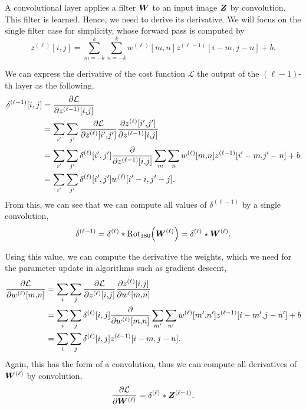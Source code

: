 A convolutional layer applies a filter $\bm{W}$ to an input image $\bm{Z}$ by convolution. This
filter is learned. Hence, we need to derive its derivative. We will focus on the single filter case
for simplicity, whose forward pass is computed by \[
    z^{(\ell)}[i,j] = \sum_{m=-k}^{k} \sum_{n=-k}^{k} w^{(\ell)}[m,n] z^{(\ell-1)}[i-m,j-n] + b.
\]

We can express the derivative of the cost function $\mathcal{L}$ \wrt the output of the
$(\ell-1)$-th layer as the following,
\begin{align*}
    \delta^{(\ell-1)}[i,j] & = \pdv{\mathcal{L}}{z^{(\ell-1)}[i{,}j]}                                                                                                   \\
                           & = \sum_{i'} \sum_{j'} \pdv{\mathcal{L}}{z^{(\ell)}[i'{,}j']} \pdv{z^{(\ell)}[i'{,}j']}{z^{(\ell-1)}[i{,}j]}                                \\
                           & = \sum_{i'} \sum_{j'} \delta^{(\ell)}[i',j'] \pdv*{\sum_{m} \sum_{n} w^{(\ell)}[m{,}n] z^{(\ell-1)}[i'-m{,}j'-n] + b}{z^{(\ell-1)}[i{,}j]} \\
                           & = \sum_{i'} \sum_{j'} \delta^{(\ell)}[i',j'] w^{(\ell)}[i'-i,j'-j].
\end{align*}
From this, we can see that we can compute all values of $\delta^{(\ell-1)}$ by a single convolution, \[
    \delta^{(\ell-1)} = \delta^{(\ell)} * \mathrm{Rot}_{180} \lft( \mat{W}^{(\ell)} \rgt) = \delta^{(\ell)} \star \mat{W}^{(\ell)}.
\]

Using this value, we can compute the derivative \wrt the weights, which we need for the parameter
update in algorithms such as gradient descent,
\begin{align*}
    \pdv{\mathcal{L}}{w^{(\ell)}[m{,}n]} & = \sum_{i} \sum_{j} \pdv{\mathcal{L}}{z^{(\ell)}[i{,}j]} \pdv{z^{(\ell)}[i{,}j]}{w^{\ell}[m{,}n]}                                        \\
                                         & = \sum_{i} \sum_{j} \delta^{(\ell)}[i,j] \pdv*{\sum_{m'} \sum_{n'} w^{(\ell)}[m'{,}n'] z^{(\ell-1)}[i-m'{,}j-n'] + b}{w^{(\ell)}[m{,}n]} \\
                                         & = \sum_{i} \sum_{j} \delta^{(\ell)}[i,j] z^{(\ell-1)}[i-m,j-n].
\end{align*}
Again, this has the form of a convolution, thus we can compute all derivatives of $\bm{W}^{(\ell)}$ by convolution, \[
    \pdv{\mathcal{L}}{\bm{W}^{(\ell)}} = \delta^{(\ell)} * \bm{Z}^{(\ell-1)}.
\]

